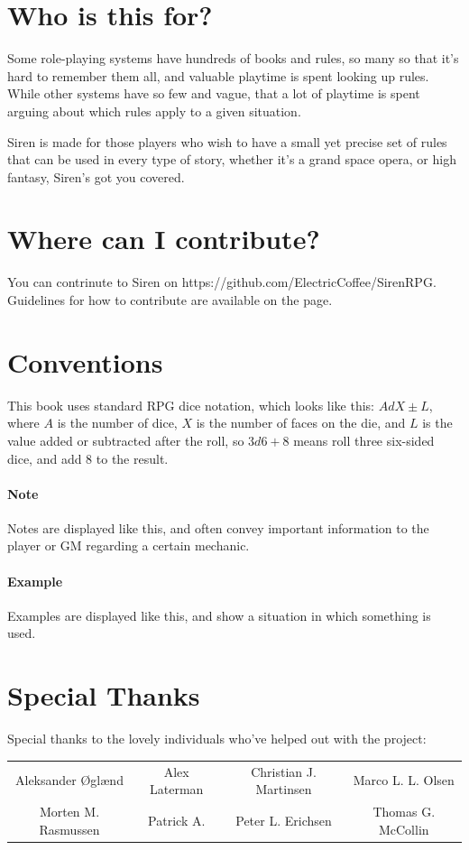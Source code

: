 \documentclass[a4paper]{book}
\begin{document}
\section*{Who is this for?}
Some role-playing systems have hundreds of books and rules, so many so that it's hard to remember them all, and valuable playtime is spent looking up rules. 
While other systems have so few and vague, that a lot of playtime is spent arguing about which rules apply to a given situation.

Siren is made for those players who wish to have a small yet precise set of rules that can be used in every type of story, whether it's a grand space opera, or high fantasy, Siren's got you covered.

\section*{Where can I contribute?}
You can contrinute to Siren on https://github.com/ElectricCoffee/SirenRPG.
Guidelines for how to contribute are available on the page.

\section*{Conventions}
This book uses standard RPG dice notation, which looks like this: $AdX\pm L$, where $A$ is the number of dice, $X$ is the number of faces on the die, and $L$ is the value added or subtracted after the roll, so $3d6+8$ means roll three six-sided dice, and add 8 to the result.
\paragraph{Note} Notes are displayed like this, and often convey important information to the player or GM regarding a certain mechanic.
\paragraph{Example} Examples are displayed like this, and show a situation in which something is used.

\newpage
\section*{Special Thanks}
Special thanks to the lovely individuals who've helped out with the project:
\begin{center}
    \begin{tabular}{cccc}
        Aleksander Øglænd & Alex Laterman & Christian J. Martinsen & Marco L. L. Olsen \\ 
        Morten M. Rasmussen & Patrick A. & Peter L. Erichsen & Thomas G. McCollin \\
    \end{tabular}
\end{center}
\end{document}
